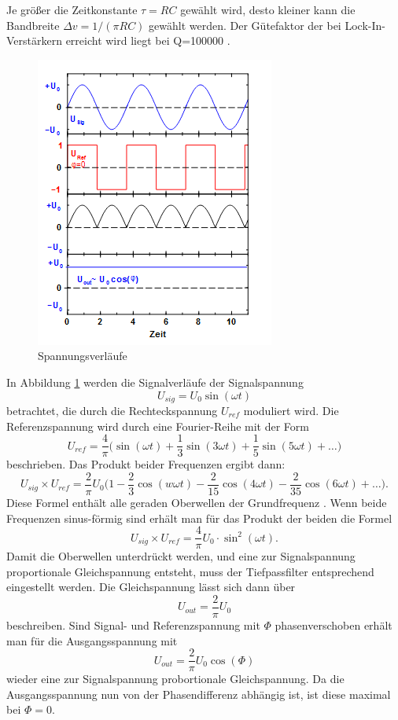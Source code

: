 Je größer die Zeitkonstante $\tau =RC$ gewählt wird, desto kleiner kann die
Bandbreite $\Delta v=1/(\pi RC)$ gewählt werden.
Der Gütefaktor der bei Lock-In-Verstärkern erreicht wird liegt bei Q=100000
\cite{303}.
\newpage
\begin{figure}[h]
  \centering
  \includegraphics{Bilder/Spannung.jpeg}
  \caption{Spannungsverläufe}
  \label{fig:spannung}
\end{figure}
In Abbildung \ref{fig:spannung} werden die Signalverläufe der Signalspannung
\begin{equation}
  U_{sig}=U_0\sin(\omega t)
\end{equation}
betrachtet, die durch die Rechteckspannung $U_{ref}$ moduliert wird.
Die Referenzspannung wird durch eine Fourier-Reihe mit der Form
\begin{equation}
  U_{ref}=\frac{4}{\pi}\biggl(\sin(\omega t)+\frac{1}{3}\sin(3\omega t)
  +\frac{1}{5}\sin(5\omega t)+\dots\biggr)
\end{equation}
beschrieben. Das Produkt beider Frequenzen ergibt dann:
\begin{equation}
  U_{sig}\times U_{ref} =\frac{2}{\pi}U_0\biggl(1-\frac{2}{3}\cos(w\omega t)
  -\frac{2}{15}\cos(4\omega t)-\frac{2}{35}\cos(6\omega t)+\dots\biggr).
\end{equation}
Diese Formel enthält alle geraden Oberwellen der Grundfrequenz \omega.
Wenn beide Frequenzen sinus-förmig sind erhält man für das Produkt der beiden
die Formel
\begin{equation}
  U_{sig}\times U_{ref}=\frac{4}{\pi}U_0 \cdot \sin^2(\omega t).
\end{equation}
Damit die Oberwellen unterdrückt werden, und eine zur Signalspannung proportionale
Gleichspannung entsteht, muss der Tiefpassfilter entsprechend eingestellt werden.
Die Gleichspannung lässt sich dann über
\begin{equation}
  U_{out}=\frac{2}{\pi}U_0
\end{equation}
beschreiben.
Sind Signal- und Referenzspannung mit $\Phi$ phasenverschoben erhält man für
die Ausgangsspannung mit
\begin{equation}
  U_{out}=\frac{2}{\pi}U_0\cos(\Phi)
\end{equation}
wieder eine zur Signalspannung probortionale Gleichspannung. Da die Ausgangsspannung
nun von der Phasendifferenz abhängig ist, ist diese maximal bei $\Phi=0$.

